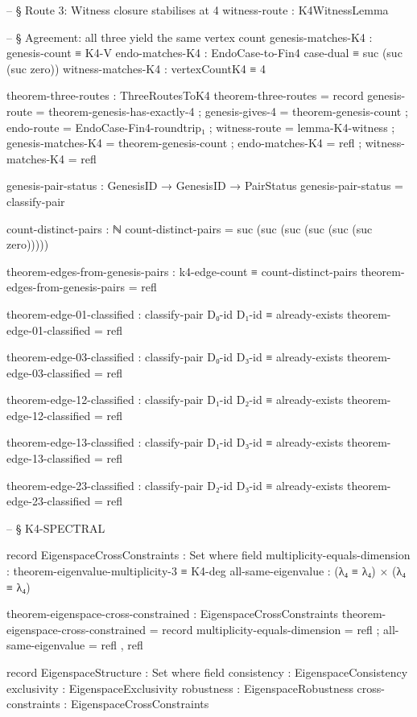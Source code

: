 \documentclass[11pt,a4paper]{book}
\begin{document}
\begin{code}
    -- § Route 3: Witness closure stabilises at 4
    witness-route       : K4WitnessLemma

    -- § Agreement: all three yield the same vertex count
    genesis-matches-K4  : genesis-count ≡ K4-V
    endo-matches-K4     : EndoCase-to-Fin4 case-dual ≡ suc (suc (suc zero))
    witness-matches-K4  : vertexCountK4 ≡ 4

theorem-three-routes : ThreeRoutesToK4
theorem-three-routes = record
  { genesis-route      = theorem-genesis-has-exactly-4
  ; genesis-gives-4    = theorem-genesis-count
  ; endo-route         = EndoCase-Fin4-roundtrip₁
  ; witness-route      = lemma-K4-witness
  ; genesis-matches-K4 = theorem-genesis-count
  ; endo-matches-K4    = refl
  ; witness-matches-K4 = refl
  }

genesis-pair-status : GenesisID → GenesisID → PairStatus
genesis-pair-status = classify-pair

count-distinct-pairs : ℕ
count-distinct-pairs = suc (suc (suc (suc (suc (suc zero)))))

theorem-edges-from-genesis-pairs : k4-edge-count ≡ count-distinct-pairs
theorem-edges-from-genesis-pairs = refl

theorem-edge-01-classified : classify-pair D₀-id D₁-id ≡ already-exists
theorem-edge-01-classified = refl


theorem-edge-03-classified : classify-pair D₀-id D₃-id ≡ already-exists
theorem-edge-03-classified = refl

theorem-edge-12-classified : classify-pair D₁-id D₂-id ≡ already-exists
theorem-edge-12-classified = refl

theorem-edge-13-classified : classify-pair D₁-id D₃-id ≡ already-exists
theorem-edge-13-classified = refl

theorem-edge-23-classified : classify-pair D₂-id D₃-id ≡ already-exists
theorem-edge-23-classified = refl


-- § K4-SPECTRAL

record EigenspaceCrossConstraints : Set where
  field
    multiplicity-equals-dimension : theorem-eigenvalue-multiplicity-3 ≡ K4-deg
    all-same-eigenvalue : (λ₄ ≡ λ₄) × (λ₄ ≡ λ₄)

theorem-eigenspace-cross-constrained : EigenspaceCrossConstraints  
theorem-eigenspace-cross-constrained = record
  { multiplicity-equals-dimension = refl
  ; all-same-eigenvalue = refl , refl
  }

record EigenspaceStructure : Set where
  field
    consistency      : EigenspaceConsistency
    exclusivity      : EigenspaceExclusivity
    robustness       : EigenspaceRobustness
    cross-constraints : EigenspaceCrossConstraints


\end{code}
\end{document}
